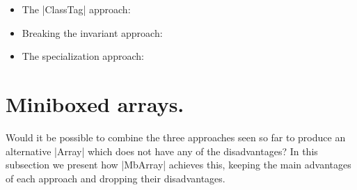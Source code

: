 \vspace{-1em}
\begin{itemize}
  \item The |ClassTag| approach:
  \item Breaking the invariant approach:
  \item The specialization approach:
\end{itemize}
\vspace{-1em}

\section{Miniboxed arrays.} 

Would it be possible to combine the three approaches seen so far to produce an alternative |Array| which does not have any of the disadvantages? In this subsection we present how |MbArray| achieves this, keeping the main advantages of each approach and dropping their disadvantages.




